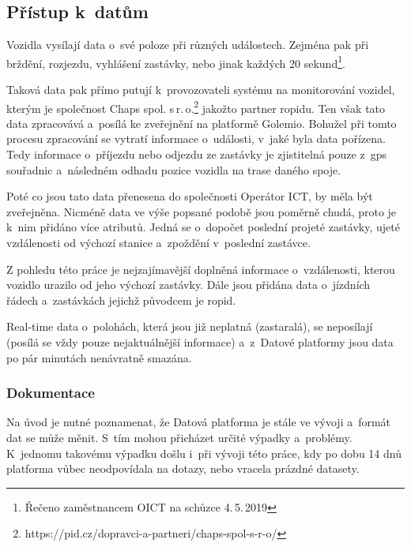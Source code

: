 \subsection{Přístup k~datům}

Vozidla vysílají data o~své poloze při různých událostech. Zejména pak při brždění, rozjezdu, vyhlášení zastávky, nebo jinak každých 20 sekund\footnote{Řečeno zaměstnancem OICT na schůzce 4.\,5.\,2019}.

\bigbreak

Taková data pak přímo putují k~provozovateli systému na monitorování vozidel, kterým je společnost Chaps spol. s\,r.\,o.\footnote{https://pid.cz/dopravci-a-partneri/chaps-spol-s-r-o/} jakožto partner \gls{ropid}u. Ten však tato data zpracovává a~posílá ke zveřejnění na platformě Golemio. Bohužel při tomto procesu zpracování se vytratí informace o~události, v~jaké byla data pořízena. Tedy informace o~příjezdu nebo odjezdu ze zastávky je zjistitelná pouze z~\gls{gps} souřadnic a~následném odhadu pozice vozidla na trase daného spoje.

\bigbreak

Poté co jsou tato data přenesena do společnosti Operátor ICT, by měla být zveřejněna. Nicméně data ve výše popsané podobě jsou poměrně chudá, proto je k~nim přidáno více atributů. Jedná se o~dopočet poslední projeté zastávky, ujeté vzdálenosti od výchozí stanice a~zpoždění v~poslední zastávce.

\bigbreak

Z pohledu této práce je nejzajímavější doplněná informace o~vzdálenosti, kterou vozidlo urazilo od jeho výchozí zastávky. Dále jsou přidána data o~jízdních řádech a~zastávkách jejichž původcem je \gls{ropid}.

\bigbreak

Real-time data o~polohách, která jsou již neplatná (zastaralá), se neposílají (posílá se vždy pouze nejaktuálnější informace) a~z~Datové platformy jsou data po pár minutách nenávratně smazána.

\subsubsection{Dokumentace}

Na úvod je nutné poznamenat, že Datová platforma je stále ve vývoji a~formát dat se může měnit. S~tím mohou přicházet určité výpadky a~problémy. K~jednomu takovému výpadku došlu i~při vývoji této práce, kdy po dobu 14 dnů platforma vůbec neodpovídala na dotazy, nebo vracela prázdné datasety.

